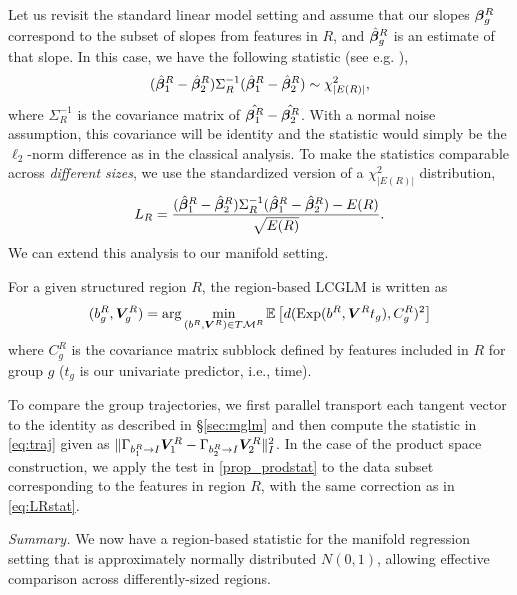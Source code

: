 Let us revisit the standard linear model setting and assume that 
our slopes $\bm{\beta}_g^R$ correspond to the subset of slopes from features in $R$, and $\hat{\bm{\beta}}_g^R$ is an estimate of that slope. In this case, we have the following  statistic (see e.g. \cite{seber2003linear}),
\begin{align}
(\hat{\bm{\beta}}_1^R - \hat{\bm{\beta}}_2^R)\Sigma_R^{-1}(\hat{\bm{\beta}}_1^R - \hat{\bm{\beta}}_2^R) \sim \chi_{|E(R)|}^2,
\end{align}
where $\Sigma_R^{-1}$ is the covariance matrix of $\hat{\bm{\beta}_1^R} - \hat{\bm{\beta}_2^R}$. With a normal noise assumption, this covariance will 
be identity and the statistic would simply be the $\ell_2$-norm difference as in the classical analysis. 
To make the statistics comparable across {\em different sizes}, we use the standardized version of a $\chi_{|E(R)|}^2$ distribution,
{\small\begin{align}\label{eq:LRstat}
L_R = \frac{(\hat{\bm{\beta}}_1^R - \hat{\bm{\beta}}_2^R)\Sigma_R^{-1}(\hat{\bm{\beta}}_1^R - \hat{\bm{\beta}}_2^R) - E(R) }{ \sqrt{E(R)} }.
\end{align}}
We can extend this analysis to our manifold setting.
\begin{definition}
For a given structured region $R$, the region-based LCGLM is written as
{ \begin{equation}
(b_g^R,\bm{V}_g^R) = \arg\min_{(b^R,\bm{V}^R) \in T\mathcal{M}^R} 
	\mathbb{E} \left[ d(\text{Exp}(b^R, \bm{V}^R t_g),C_g^R)^2\right]
\end{equation}}
where $C_g^R$ is the covariance matrix subblock defined by features included in $R$ for group $g$ ($t_g$ is our univariate predictor, i.e., time).
\end{definition}
To compare the group trajectories, we first parallel transport each tangent vector to the identity as described in \S\ref{sec:mglm} and then compute the statistic in \eqref{eq:traj} given as $\|\Gamma_{b_1^R \rightarrow I} \bm{V}_1^R - \Gamma_{b_2^R \rightarrow I} \bm{V}_2^R \|_{I}^2$.
In the case of the product space construction, we apply the test in \eqref{prop_prodstat} to the data subset corresponding to the features 
in region $R$, with the same correction as in \eqref{eq:LRstat}.

{\em Summary.} We now have a region-based statistic for the manifold regression setting that is approximately normally distributed $N(0,1)$, allowing effective comparison across differently-sized regions.

